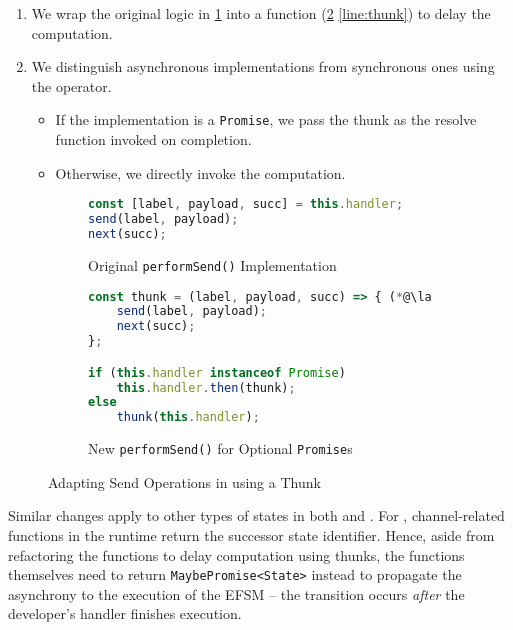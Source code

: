 \begin{enumerate}
\item
We wrap the original logic in \cref{subfig:originalthunk} into a
function (\cref{subfig:newthunk} \cref{line:thunk})
to delay the computation.

\item
We distinguish asynchronous implementations
from synchronous ones using the  operator.

\begin{itemize}
\item
If the implementation is a \texttt{Promise}, we pass
the thunk as the resolve function invoked on completion.

\item
Otherwise, we directly invoke the computation.
\end{itemize}

\end{enumerate}

\begin{figure}[!h]
\begin{subfigure}{\textwidth}
\begin{lstlisting}[language=javascript,tabsize=2]
const [label, payload, succ] = this.handler;
send(label, payload);
next(succ);
\end{lstlisting}
\caption{Original \texttt{performSend()} Implementation}
\label{subfig:originalthunk}
\end{subfigure}
\hfill
\begin{subfigure}{\textwidth}
\begin{lstlisting}[language=javascript,tabsize=2]
const thunk = (label, payload, succ) => { (*@\label{line:thunk}@*)
	send(label, payload);
	next(succ);	
};

if (this.handler instanceof Promise)
	this.handler.then(thunk);
else
	thunk(this.handler);
\end{lstlisting}
\caption{New \texttt{performSend()} for Optional \texttt{Promise}s}
\label{subfig:newthunk}
\end{subfigure}
\caption{Adapting Send Operations in 
using a Thunk}
\label{fig:thunk}
\end{figure}

Similar changes apply to other types of states in both
 and .
For , channel-related functions in the runtime
return the successor state identifier. Hence, aside from
refactoring the functions to delay computation using thunks,
the functions themselves need to
return \texttt{MaybePromise<State>} instead
to propagate the asynchrony
to the execution of the EFSM -- the transition occurs
\textit{after} the developer's handler finishes execution.


